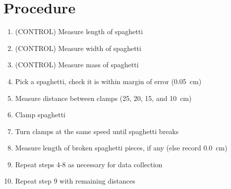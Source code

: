 \documentclass[a4paper]{article}
\begin{document}
    \section{Procedure}
        \begin{enumerate}
            \item (CONTROL) Measure length of spaghetti
            \item (CONTROL) Measure width of spaghetti
            \item (CONTROL) Measure mass of spaghetti
            \item Pick a spaghetti, check it is within margin of error (\SI{0.05}{\cm})
            \item Measure distance between clamps (25, 20, 15, and \SI{10}{\cm})
            \item Clamp spaghetti
            \item Turn clamps at the same speed until spaghetti breaks
            \item Measure length of broken spaghetti pieces, if any (else record \SI{0.0}{\cm})
            \item Repeat steps 4-8 as necessary for data collection
            \item Repeat step 9 with remaining distances
        \end{enumerate}
\end{document}
